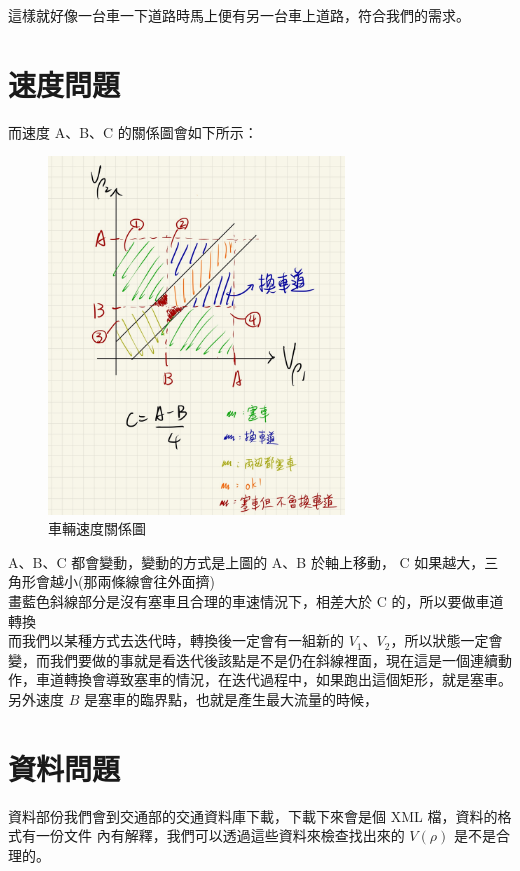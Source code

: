 \documentclass[a4paper, 11pt]{report}
\begin{document}
這樣就好像一台車一下道路時馬上便有另一台車上道路，符合我們的需求。 \newpage

\section{速度問題}

而速度 A、B、C 的關係圖會如下所示：

\begin{figure}[h] 
\centering 
\includegraphics[width=0.7\textwidth]{11-1} 
\caption{車輛速度關係圖} 
\label{Fig.main2} 
\end{figure}

A、B、C 都會變動，變動的方式是上圖的 A、B 於軸上移動， C 如果越大，三角形會越小(那兩條線會往外面擠)\\

畫藍色斜線部分是沒有塞車且合理的車速情況下，相差大於 C 的，所以要做車道轉換\\

而我們以某種方式去迭代時，轉換後一定會有一組新的 $V_1$、$V_2$，所以狀態一定會變，而我們要做的事就是看迭代後該點是不是仍在斜線裡面，現在這是一個連續動作，車道轉換會導致塞車的情況，在迭代過程中，如果跑出這個矩形，就是塞車。另外速度 $B$ 是塞車的臨界點，也就是產生最大流量的時候，

\section{資料問題}

資料部份我們會到交通部的交通資料庫下載，下載下來會是個 XML 檔，資料的格式有一份文件 \cite{xml_explanation} 內有解釋，我們可以透過這些資料來檢查找出來的 $V(\rho)$ 是不是合理的。
\end{document}
